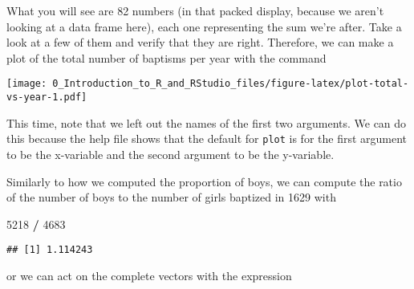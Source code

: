 \documentclass[]{article}
\newenvironment{Shaded}{\begin{snugshade}}{\end{snugshade}}
\newcommand{\KeywordTok}[1]{\textcolor[rgb]{0.13,0.29,0.53}{\textbf{#1}}}
\newcommand{\DataTypeTok}[1]{\textcolor[rgb]{0.13,0.29,0.53}{#1}}
\newcommand{\DecValTok}[1]{\textcolor[rgb]{0.00,0.00,0.81}{#1}}
\newcommand{\StringTok}[1]{\textcolor[rgb]{0.31,0.60,0.02}{#1}}
\newcommand{\OperatorTok}[1]{\textcolor[rgb]{0.81,0.36,0.00}{\textbf{#1}}}
\newcommand{\NormalTok}[1]{#1}
\begin{document}
What you will see are 82 numbers (in that packed display, because we
aren't looking at a data frame here), each one representing the sum
we're after. Take a look at a few of them and verify that they are
right. Therefore, we can make a plot of the total number of baptisms per
year with the command

\begin{Shaded}
\end{Shaded}

\texttt{[image: 0\_Introduction\_to\_R\_and\_RStudio\_files/figure-latex/plot-total-vs-year-1.pdf]}

This time, note that we left out the names of the first two arguments.
We can do this because the help file shows that the default for
\texttt{plot} is for the first argument to be the x-variable and the
second argument to be the y-variable.

Similarly to how we computed the proportion of boys, we can compute the
ratio of the number of boys to the number of girls baptized in 1629 with

\begin{Shaded}
\begin{Highlighting}[]
\DecValTok{5218} \OperatorTok{/}\StringTok{ }\DecValTok{4683}
\end{Highlighting}
\end{Shaded}

\begin{verbatim}
## [1] 1.114243
\end{verbatim}

or we can act on the complete vectors with the expression

\begin{Shaded}
\end{Shaded}
\end{document}
